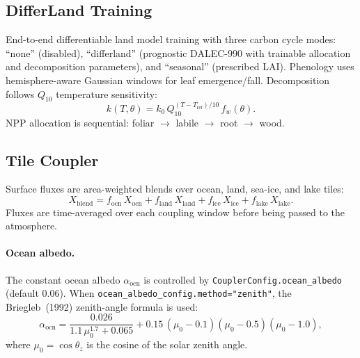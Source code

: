 \documentclass[11pt,a4paper]{article}
\begin{document}
\subsection{DifferLand Training}

End-to-end differentiable land model training with three carbon cycle modes: ``none'' (disabled), ``differland'' (prognostic DALEC-990 with trainable allocation and decomposition parameters), and ``seasonal'' (prescribed LAI).  Phenology uses hemisphere-aware Gaussian windows for leaf emergence/fall.  Decomposition follows $Q_{10}$ temperature sensitivity:
\begin{equation}
  k(T,\theta)=k_0\,Q_{10}^{(T-T_{\mathrm{ref}})/10}\,f_w(\theta).
\end{equation}
NPP allocation is sequential: foliar $\to$ labile $\to$ root $\to$ wood.

\subsection{Tile Coupler}

Surface fluxes are area-weighted blends over ocean, land, sea-ice, and lake tiles:
\begin{equation}
  X_{\mathrm{blend}} = f_{\mathrm{ocn}}\,X_{\mathrm{ocn}} + f_{\mathrm{land}}\,X_{\mathrm{land}} + f_{\mathrm{ice}}\,X_{\mathrm{ice}} + f_{\mathrm{lake}}\,X_{\mathrm{lake}}.
\end{equation}
Fluxes are time-averaged over each coupling window before being passed to the atmosphere.

\paragraph{Ocean albedo.}
The constant ocean albedo $\alpha_{\mathrm{ocn}}$ is controlled by \texttt{CouplerConfig.ocean\_albedo} (default 0.06).  When \texttt{ocean\_albedo\_config.method="zenith"}, the Briegleb~(1992) zenith-angle formula is used:
\begin{equation}
  \alpha_{\mathrm{ocn}} = \frac{0.026}{1.1\,\mu_0^{1.7}+0.065} + 0.15\,(\mu_0-0.1)(\mu_0-0.5)(\mu_0-1.0),
\end{equation}
where $\mu_0=\cos\theta_z$ is the cosine of the solar zenith angle.
\end{document}
